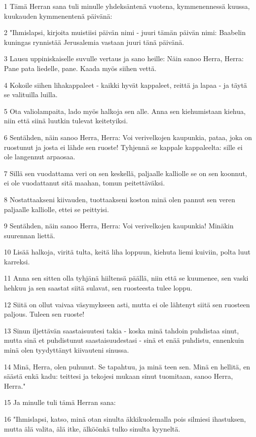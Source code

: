 \par 1 Tämä Herran sana tuli minulle yhdeksäntenä vuotena, kymmenennessä kuussa, kuukauden kymmenentenä päivänä:
\par 2 "Ihmislapsi, kirjoita muistiisi päivän nimi - juuri tämän päivän nimi: Baabelin kuningas rynnistää Jerusalemia vastaan juuri tänä päivänä.
\par 3 Lausu uppiniskaiselle suvulle vertaus ja sano heille: Näin sanoo Herra, Herra: Pane pata liedelle, pane. Kaada myös siihen vettä.
\par 4 Kokoile siihen lihakappaleet - kaikki hyvät kappaleet, reittä ja lapaa - ja täytä se valituilla luilla.
\par 5 Ota valiolampaita, lado myös halkoja sen alle. Anna sen kiehumistaan kiehua, niin että siinä luutkin tulevat keitetyiksi.
\par 6 Sentähden, näin sanoo Herra, Herra: Voi verivelkojen kaupunkia, pataa, joka on ruostunut ja josta ei lähde sen ruoste! Tyhjennä se kappale kappaleelta: sille ei ole langennut arpaosaa.
\par 7 Sillä sen vuodattama veri on sen keskellä, paljaalle kalliolle se on sen koonnut, ei ole vuodattanut sitä maahan, tomun peitettäväksi.
\par 8 Nostattaakseni kiivauden, tuottaakseni koston minä olen pannut sen veren paljaalle kalliolle, ettei se peittyisi.
\par 9 Sentähden, näin sanoo Herra, Herra: Voi verivelkojen kaupunkia! Minäkin suurennan liettä.
\par 10 Lisää halkoja, viritä tulta, keitä liha loppuun, kiehuta liemi kuiviin, polta luut karreksi.
\par 11 Anna sen sitten olla tyhjänä hiiltensä päällä, niin että se kuumenee, sen vaski hehkuu ja sen saastat siitä sulavat, sen ruosteesta tulee loppu.
\par 12 Siitä on ollut vaivaa väsymykseen asti, mutta ei ole lähtenyt siitä sen ruosteen paljous. Tuleen sen ruoste!
\par 13 Sinun iljettävän saastaisuutesi takia - koska minä tahdoin puhdistaa sinut, mutta sinä et puhdistunut saastaisuudestasi - sinä et enää puhdistu, ennenkuin minä olen tyydyttänyt kiivauteni sinussa.
\par 14 Minä, Herra, olen puhunut. Se tapahtuu, ja minä teen sen. Minä en hellitä, en säästä enkä kadu: teittesi ja tekojesi mukaan sinut tuomitaan, sanoo Herra, Herra."
\par 15 Ja minulle tuli tämä Herran sana:
\par 16 "Ihmislapsi, katso, minä otan sinulta äkkikuolemalla pois silmiesi ihastuksen, mutta älä valita, älä itke, älköönkä tulko sinulta kyyneltä.
